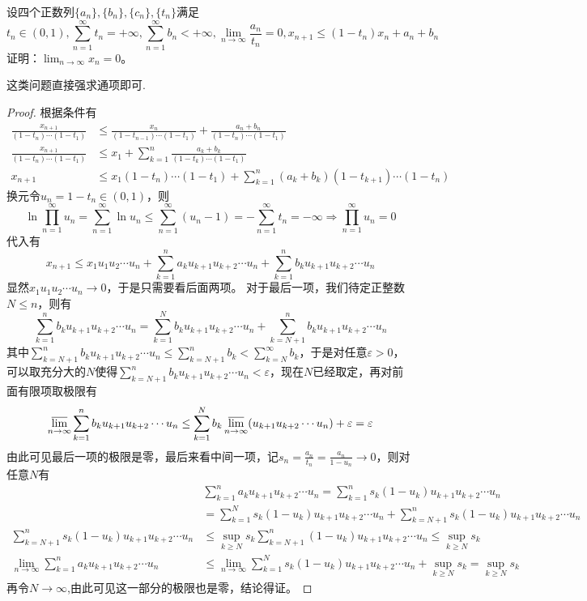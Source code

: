 \documentclass[../../main.tex]{subfiles}
\begin{document}
\begin{example}
设四个正数列\(\{a_n\},\{b_n\},\{c_n\},\{t_n\}\)满足
\[t_n\in(0,1),\sum_{n = 1}^{\infty}t_n=+\infty,\sum_{n = 1}^{\infty}b_n<+\infty,\lim_{n\rightarrow\infty}\frac{a_n}{t_n}=0,x_{n + 1}\leq(1 - t_n)x_n+a_n + b_n\]
证明：\(\lim_{n\rightarrow\infty}x_n = 0\)。
\end{example}
\begin{note}
这类问题直接强求通项即可.
\end{note}
\begin{proof}
根据条件有
\begin{align*}
\frac{x_{n + 1}}{(1 - t_n)\cdots(1 - t_1)}&\leq\frac{x_n}{(1 - t_{n-1})\cdots(1 - t_1)}+\frac{a_n + b_n}{(1 - t_n)\cdots(1 - t_1)}\\
\frac{x_{n + 1}}{(1 - t_n)\cdots(1 - t_1)}&\leq x_1+\sum_{k = 1}^{n}\frac{a_k + b_k}{(1 - t_k)\cdots(1 - t_1)}\\
x_{n + 1}&\leq x_1(1 - t_n)\cdots(1 - t_1)+\sum_{k = 1}^{n}(a_k + b_k)(1 - t_{k + 1})\cdots(1 - t_n)
\end{align*}
换元令\(u_n = 1 - t_n\in(0,1)\)，则
\[\ln\prod_{n = 1}^{\infty}u_n=\sum_{n = 1}^{\infty}\ln u_n\leq\sum_{n = 1}^{\infty}(u_n - 1)=-\sum_{n = 1}^{\infty}t_n=-\infty\Rightarrow\prod_{n = 1}^{\infty}u_n = 0\]
代入有
\[x_{n + 1}\leq x_1u_1u_2\cdots u_n+\sum_{k = 1}^{n}a_ku_{k + 1}u_{k + 2}\cdots u_n+\sum_{k = 1}^{n}b_ku_{k + 1}u_{k + 2}\cdots u_n\]
显然\(x_1u_1u_2\cdots u_n\rightarrow0\)，于是只需要看后面两项。
对于最后一项，我们待定正整数\(N\leq n\)，则有
\[\sum_{k = 1}^{n}b_ku_{k + 1}u_{k + 2}\cdots u_n=\sum_{k = 1}^{N}b_ku_{k + 1}u_{k + 2}\cdots u_n+\sum_{k = N + 1}^{n}b_ku_{k + 1}u_{k + 2}\cdots u_n\]
其中\(\sum_{k = N + 1}^{n}b_ku_{k + 1}u_{k + 2}\cdots u_n\leq\sum_{k = N + 1}^{n}b_k<\sum_{k = N}^{\infty}b_k\)，于是对任意\(\varepsilon>0\)，可以取充分大的\(N\)使得\(\sum_{k = N + 1}^{n}b_ku_{k + 1}u_{k + 2}\cdots u_n<\varepsilon\)，现在\(N\)已经取定，再对前面有限项取极限有
\[\varlimsup_{n\rightarrow\infty}\sum_{k = 1}^{n}b_ku_{k + 1}u_{k + 2}\cdots u_n\leq\sum_{k = 1}^{N}b_k\varlimsup_{n\rightarrow\infty}(u_{k + 1}u_{k + 2}\cdots u_n)+\varepsilon=\varepsilon\]
由此可见最后一项的极限是零，最后来看中间一项，记\(s_n=\frac{a_n}{t_n}=\frac{a_n}{1 - u_n}\rightarrow0\)，则对任意\(N\)有
\begin{align*}
&\sum_{k = 1}^{n}a_ku_{k + 1}u_{k + 2}\cdots u_n=\sum_{k = 1}^{n}s_k(1 - u_k)u_{k + 1}u_{k + 2}\cdots u_n\\
&=\sum_{k = 1}^{N}s_k(1 - u_k)u_{k + 1}u_{k + 2}\cdots u_n+\sum_{k = N + 1}^{n}s_k(1 - u_k)u_{k + 1}u_{k + 2}\cdots u_n\\
\sum_{k = N + 1}^{n}s_k(1 - u_k)u_{k + 1}u_{k + 2}\cdots u_n&\leq\sup_{k\geq N}s_k\sum_{k = N + 1}^{n}(1 - u_k)u_{k + 1}u_{k + 2}\cdots u_n\leq\sup_{k\geq N}s_k\\
\lim_{n\rightarrow\infty}\sum_{k = 1}^{n}a_ku_{k + 1}u_{k + 2}\cdots u_n&\leq\lim_{n\rightarrow\infty}\sum_{k = 1}^{N}s_k(1 - u_k)u_{k + 1}u_{k + 2}\cdots u_n+\sup_{k\geq N}s_k=\sup_{k\geq N}s_k
\end{align*}
再令$N\to \infty$,由此可见这一部分的极限也是零，结论得证。
\end{proof}
\end{document}
